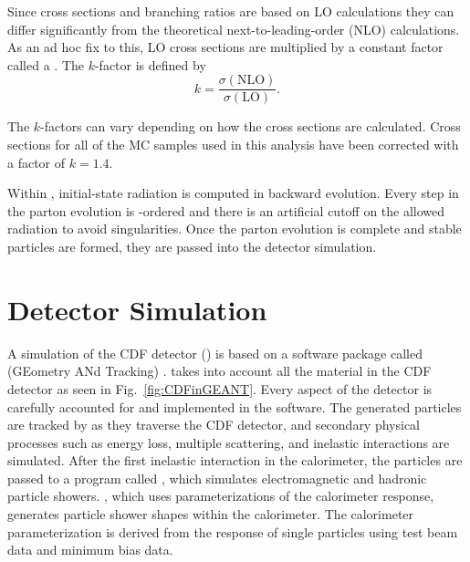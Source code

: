 Since \pythiaText cross sections and branching ratios are based on LO calculations they can differ significantly from the theoretical next-to-leading-order (NLO) calculations. As an ad hoc fix to this, LO \pythiaText cross sections are multiplied by a constant factor called a . The $k$-factor is defined by
\begin{equation}
 k=\frac{\sigma(\mbox{NLO})}{\sigma(\mbox{LO})}.
\end{equation}

The $k$-factors can vary depending on how the cross sections are calculated. Cross sections for all of the \pythiaText MC samples used in this analysis have been corrected with a factor of $k=1.4$.

Within \pythiaText, initial-state radiation is computed in backward evolution. Every step in the parton evolution is \pt-ordered and there is an artificial cutoff on the allowed radiation to avoid singularities. Once the parton evolution is complete and stable particles are formed, they are passed into the detector simulation.


\section{Detector Simulation}\label{sec:cdfsim}
A simulation of the CDF detector (\cdfsimText) \cite{www:CDFSIM} is based on a software package called \geantText (GEometry ANd Tracking) \cite{www:GEANT}. \geantText takes into account all the material in the CDF detector as seen in Fig.~\ref{fig:CDFinGEANT}. Every aspect of the detector is carefully accounted for and implemented in the software. The generated particles are tracked by \geantText as they traverse the CDF detector, and secondary physical processes such as energy loss, multiple scattering, and inelastic interactions are simulated. After the first inelastic interaction in the calorimeter, the particles are passed to a program called \gflashText \cite{pap:GFLASH}, which simulates electromagnetic and hadronic particle showers. \gflashText, which uses parameterizations of the calorimeter response, generates particle shower shapes within the calorimeter. The calorimeter parameterization is derived from the response of single particles using test beam data and minimum bias data.

